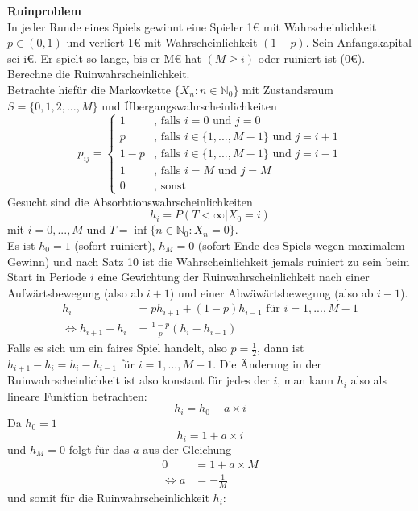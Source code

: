 \documentclass[a4paper,12pt]{article}
\begin{document}
\begin{tcolorbox}[breakable, colframe=blue, colback=white, title=Beispiel 9]
\textbf{Ruinproblem}\\
In jeder Runde eines Spiels gewinnt eine Spieler 1€ mit Wahrscheinlichkeit $p \in (0,1)$ und verliert 1€ mit Wahrscheinlichkeit $(1-p)$.
Sein Anfangskapital sei i€. Er spielt so lange, bis er M€ hat $(M \geq i)$ oder ruiniert ist (0€).\\
Berechne die Ruinwahrscheinlichkeit.\\
Betrachte hiefür die Markovkette $\{X_n: n \in \mathbb{N}_0\}$ mit Zustandsraum $S = \{0, 1, 2, ..., M\}$ und Übergangswahrscheinlichkeiten
$$
p_{ij} = \begin{cases}
1 & \text{, falls } i=0 \text{ und } j=0\\
p & \text{, falls } i \in \{1, ..., M-1\} \text{ und } j = i+1\\
1-p & \text{, falls } i \in \{1, ..., M-1\} \text{ und } j = i-1\\
1 & \text{, falls } i = M \text{ und } j = M\\
0 & \text{, sonst} 
\end{cases}
$$
Gesucht sind die Absorbtionswahrscheinlichkeiten
$$
h_i = P(T<\infty|X_0 = i)
$$
mit $i = 0, ..., M$ und $T = \inf\{n \in \mathbb{N}_0: X_n = 0\}$.\\
Es ist $h_0 = 1$ (sofort ruiniert), $h_M = 0$ (sofort Ende des Spiels wegen maximalem Gewinn) und nach Satz 10
ist die Wahrscheinlichkeit jemals ruiniert zu sein beim Start in Periode $i$ eine Gewichtung der Ruinwahrscheinlichkeit
nach einer Aufwärtsbewegung (also ab $i+1$) und einer Abwäwärtsbewegung (also ab $i-1$). 
\begin{align*}
h_i &= ph_{i+1} + (1-p)h_{i-1} \text{ für } i = 1, ..., M-1 \\
\Leftrightarrow h_{i+1} - h_i &= \frac{1-p}{p}(h_i - h_{i-1})
\end{align*}
Falls es sich um ein faires Spiel handelt, also $p =  \frac{1}{2}$, dann ist $h_{i+1} - h_i = h_i - h_{i-1}$ für $i=1, ..., M-1$. 
Die Änderung in der Ruinwahrscheinlichkeit ist also konstant für jedes der $i$, man kann $h_i$ also als lineare Funktion betrachten:
$$
h_i = h_0 + a \times i
$$
Da $h_0 = 1$
$$
h_i = 1 + a \times i
$$
und $h_M = 0$ folgt für das $a$ aus der Gleichung
\begin{align*}
0 & = 1 + a \times M \\
\Leftrightarrow a & = - \frac{1}{M}
\end{align*}
und somit für die Ruinwahrscheinlichkeit $h_i$:

\end{tcolorbox}
\end{document}

